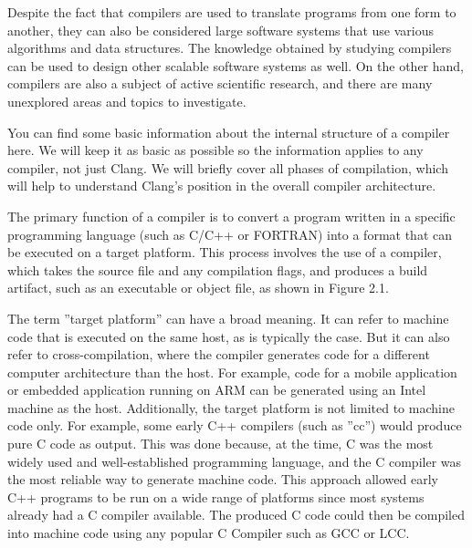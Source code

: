 Despite the fact that compilers are used to translate programs from one form to another, they can also be considered large software systems that use various algorithms and data structures. The knowledge obtained by studying compilers can be used to design other scalable software systems as well. On the other hand, compilers are also a subject of active scientific research, and there are many unexplored areas and topics to investigate.

You can find some basic information about the internal structure of a compiler here. We will keep it as basic as possible so the information applies to any compiler, not just Clang. We will briefly cover all phases of compilation, which will help to understand Clang's position in the overall compiler architecture.


The primary function of a compiler is to convert a program written in a specific programming language (such as C/C++ or FORTRAN) into a format that can be executed on a target platform. This process involves the use of a compiler, which takes the source file and any compilation flags, and produces a build artifact, such as an executable or object file, as shown in Figure 2.1.


The term ”target platform” can have a broad meaning. It can refer to machine code that is executed on the same host, as is typically the case. But it can also refer to cross-compilation, where the compiler generates code for a different computer architecture than the host. For example, code for a mobile application or embedded application running on ARM can be generated using an Intel machine as the host. Additionally, the target platform is not limited to machine code only. For example, some early C++ compilers (such as ”cc”) would produce pure C code as output. This was done because, at the time, C was the most widely used and well-established programming language, and the C compiler was the most reliable way to generate machine code. This approach allowed early C++ programs to be run on a wide range of platforms since most systems already had a C compiler available. The produced C code could then be compiled into machine code using any popular C Compiler such as GCC or LCC.



